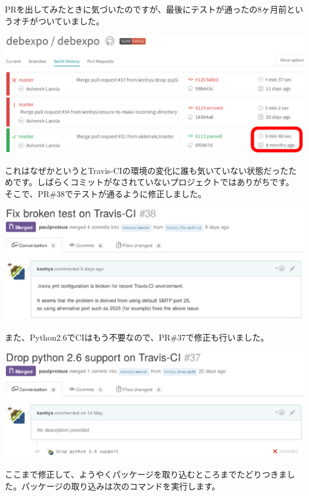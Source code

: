 \documentclass[mingoth,a4paper]{jsarticle}
\begin{document}
PRを出してみたときに気づいたのですが、最後にテストが通ったの8ヶ月前というオチがついていました。

\begin{screen}
\includegraphics[width=0.7\hsize]{image201606/broken-ci-since-8month-ago.eps}
\end{screen}

これはなぜかというとTravis-CIの環境の変化に誰も気いていない状態だったためです。しばらくコミットがなされていないプロジェクトではありがちです。
そこで、PR\#38でテストが通るように修正しました。

\begin{screen}
\includegraphics[width=0.7\hsize]{image201606/debexpo-pr38-broken-ci.eps}
\end{screen}

また、Python2.6でCIはもう不要なので、PR\#37で修正も行いました。

\begin{screen}
\includegraphics[width=0.7\hsize]{image201606/debexpo-pr37-drop-py26.eps}
\end{screen}

ここまで修正して、ようやくパッケージを取り込むところまでたどりつきました。パッケージの取り込みは次のコマンドを実行します。

\end{document}
